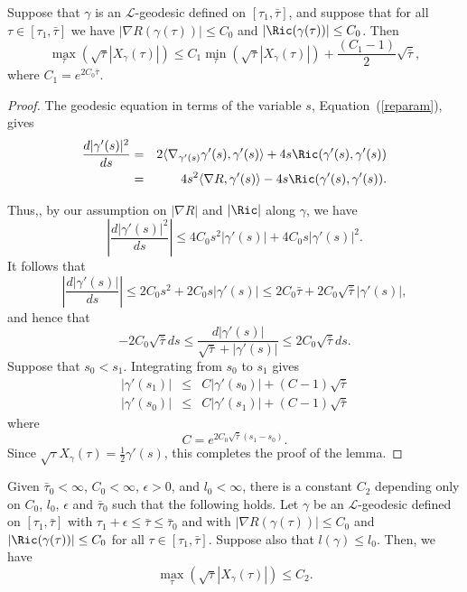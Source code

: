\begin{lemma}\label{lem:l-geodesic-min-max-estimate}
\label{min-max}
 Suppose  that
$\gamma$ is an ${\mathcal L}$-geodesic defined on
$[\tau_1,\bar\tau]$, and suppose that for all $\tau\in
[\tau_1,\bar\tau]$ we have $|\nabla R(\gamma(\tau))|\le C_0$ and
$|\Ric(\gamma(\tau))|\le C_0$. Then
$$\max_{\tau}\left(\sqrt{\tau}|X_\gamma(\tau)|\right)\le C_1\min_{\tau}\left(\sqrt{\tau}|X_\gamma(\tau)|\right)+\frac{(C_1-1)}{2}\sqrt{\bar\tau},$$
where $C_1=e^{2C_0\bar\tau}$.
\end{lemma}

\begin{proof}
The geodesic equation in terms of the variable $s$,
Equation~(\ref{reparam}), gives
\begin{eqnarray}
\frac{d|\gamma'(s)|^2}{ds} & = & 2\langle
\nabla_{\gamma'(s)}\gamma'(s),\gamma'(s)\rangle+4s\Ric(\gamma'(s),\gamma'(s))\nonumber \\
& = & 4s^2\langle\nabla R,\gamma'(s)\rangle -4s\Ric(\gamma'(s),\gamma'(s))\label{nablas}.
\end{eqnarray}

Thus,, by our assumption on $|\nabla R|$ and $|\Ric|$ along
$\gamma$, we have
$$\left|\frac{d|\gamma'(s)|^2}{ds}\right| \le
4C_0s^2|\gamma'(s)|+4C_0s|\gamma'(s)|^2.$$ It follows that
$$\left|\frac{d|\gamma'(s)|}{ds}\right|\le 2C_0s^2+2C_0s|\gamma'(s)|\le 2C_0\bar\tau+2
C_0\sqrt{\bar\tau}|\gamma'(s)|,$$ and hence that
$$-2C_0\sqrt{\bar\tau}ds\le \frac{d|\gamma'(s)|}{\sqrt{\bar\tau}+|\gamma'(s)|}
\le 2C_0\sqrt{\bar\tau}ds.$$ Suppose that $s_0<s_1$. Integrating from $s_0$ to
$s_1$ gives
\begin{eqnarray*}
|\gamma'(s_1)| & \le &  C|\gamma'(s_0)|+(C-1)\sqrt{\bar\tau} \\
|\gamma'(s_0)| & \le & C|\gamma'(s_1)|+(C-1)\sqrt{\bar\tau}
\end{eqnarray*}
where
\begin{equation*}
C=e^{2C_0\sqrt{\bar\tau}(s_1-s_0)}.
\end{equation*}
 Since
$\sqrt{\tau}X_\gamma(\tau)=\frac{1}{2}\gamma'(s)$, this completes
the proof of the lemma.
\end{proof}

\begin{corollary}\label{cor:l-geodesic-speed-bound}
\label{minmax}
Given $\bar\tau_0<\infty$, $C_0<\infty$, $\epsilon>0$, and $l_0<\infty$, there
is a constant $C_2$ depending only on $C_0$, $l_0$, $\epsilon$ and $\bar\tau_0$
such that the following holds. Let $\gamma$ be an ${\mathcal L}$-geodesic
defined on $[\tau_1,\bar\tau]$ with $\tau_1+\epsilon\le\bar\tau\le \bar\tau_0$
and with $|\nabla R(\gamma(\tau))|\le C_0$ and $|\Ric(\gamma(\tau))|\le
C_0$ for all $\tau\in [\tau_1,\bar\tau]$. Suppose also that $ l(\gamma)\le
l_0$. Then, we have
$$\max_{\tau}\left(\sqrt{\tau}|X_\gamma(\tau)|\right)\le C_2.$$
\end{corollary}

